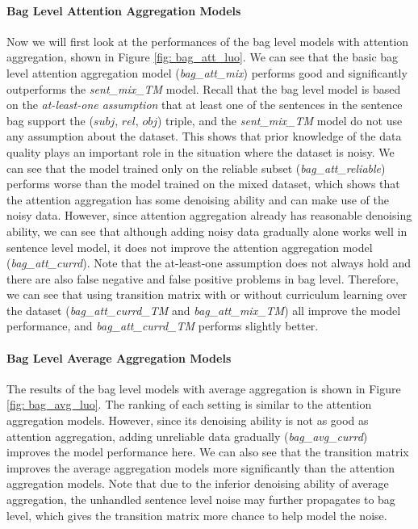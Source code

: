 \paragraph{Bag Level Attention Aggregation Models}
Now we will first look at the performances of the bag level models with attention aggregation, shown in Figure \ref{fig: bag_att_luo}. We can see that the basic bag level attention aggregation model (\emph{bag\_att\_mix}) performs good and significantly outperforms the \emph{sent\_mix\_TM} model. Recall that the bag level model is based on the \emph{at-least-one assumption} that at least one of the sentences in the sentence bag support the ($subj$, $rel$, $obj$) triple, and the \emph{sent\_mix\_TM} model do not use any assumption about the dataset. This shows that prior knowledge of the data quality plays an important role in the situation where the dataset is noisy. We can see that the model trained only on the reliable subset (\emph{bag\_att\_reliable}) performs worse than the model trained on the mixed dataset, which shows that the attention aggregation has some denoising ability and can make use of the noisy data. However, since attention aggregation already has reasonable denoising ability, we can see that although adding noisy data gradually alone works well in sentence level model, it does not improve the attention aggregation model (\emph{bag\_att\_currd}). Note that the at-least-one assumption does not always hold and there are also false negative and false positive problems in bag level. Therefore, we can see that using transition matrix with or without curriculum learning over the dataset (\emph{bag\_att\_currd\_TM} and \emph{bag\_att\_mix\_TM}) all improve the model performance, and \emph{bag\_att\_currd\_TM} performs slightly better.

\paragraph{Bag Level Average Aggregation Models}
The results of the bag level models with average aggregation is shown in Figure \ref{fig: bag_avg_luo}. The ranking of each setting is similar to the attention aggregation models. However, since its denoising ability is not as good as attention aggregation, adding unreliable data gradually (\emph{bag\_avg\_currd}) improves the model performance here. We can also see that the transition matrix improves the average aggregation models more significantly than the attention aggregation models. Note that due to the inferior denoising ability of average aggregation, the unhandled sentence level noise may further propagates to bag level, which gives the transition matrix more chance to help model the noise.
 
